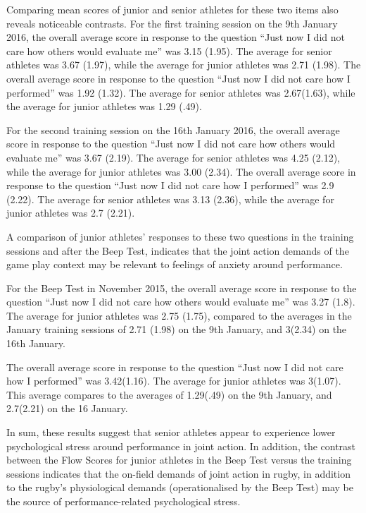 \begin{CJK}{UTF8}{gbsn}
Comparing mean scores of junior and senior athletes for these two items also reveals noticeable contrasts.  For the first training session on the 9th January 2016, the overall average score in response to the question ``Just now I did not care how others would evaluate me'' was 3.15 (1.95).  The average for senior athletes was 3.67   (1.97), while the average for junior athletes was 2.71 (1.98).
The overall average score in response to the question ``Just now I did not care how I performed'' was 1.92 (1.32).  The average for senior athletes was 2.67(1.63), while the average for junior athletes was 1.29 (.49).

For the second training session on the 16th January 2016, the overall average score in response to the question ``Just now I did not care how others would evaluate me'' was 3.67 (2.19).  The average for senior athletes was 4.25 (2.12), while the average for junior athletes was 3.00 (2.34).
The overall average score in response to the question ``Just now I did not care how I performed'' was 2.9 (2.22).  The average for senior athletes was 3.13 (2.36), while the average for junior athletes was 2.7 (2.21).


A comparison of junior athletes' responses to these two questions in the training sessions and after the Beep Test, indicates that the joint action demands of the game play context may be relevant to feelings of anxiety around performance.

For the Beep Test in November 2015, the overall average score in response to the question ``Just now I did not care how others would evaluate me'' was 3.27 (1.8).  The average for junior athletes was 2.75 (1.75), compared to the averages in the January training sessions of 2.71 (1.98) on the 9th January, and 3(2.34) on the 16th January.

The overall average score in response to the question ``Just now I did not care how I performed'' was 3.42(1.16).  The average for junior athletes was 3(1.07).  This average compares to the averages of 1.29(.49) on the 9th January, and 2.7(2.21) on the 16 January.

In sum, these results suggest that senior athletes appear to experience lower psychological stress around performance in joint action.  In addition, the contrast between the Flow Scores for junior athletes in the Beep Test versus the training sessions indicates that the on-field demands of joint action in rugby, in addition to the rugby's physiological demands (operationalised by the Beep Test) may be the source of performance-related psychological stress.



\end{CJK}
